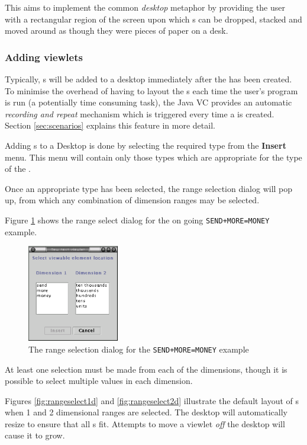 This \viewer{} aims to implement the common \emph{desktop} metaphor by
providing the user with a rectangular region of the screen upon which
\viewlet{}s can be dropped, stacked and moved around as though they
were pieces of paper on a desk.

\subsubsection{Adding viewlets}
Typically, \viewlet{}s will be added to a desktop immediately after the
\viewer{} has been created.  To minimise the overhead of having to
layout the \viewlet{}s each time the user's program is run (a
potentially time consuming task), the Java VC provides an automatic
\emph{recording and repeat} mechanism which is triggered every time a
\viewer{} is created. Section \ref{sec:scenarios} explains this
feature in more detail.

Adding \viewlet{}s to a Desktop \viewer{} is done by selecting the
required \viewlet{} type from the \textbf{Insert} menu.  This menu
will contain only those \viewlet{} types which are appropriate for the
type of the \viewable{}.

Once an appropriate \viewlet{} type has been selected, the range
selection dialog will pop up, from which any combination of dimension
ranges may be selected.

Figure \ref{fig:rangeselect} shows the range select dialog for the on
going \texttt{SEND+MORE=MONEY} example.

\begin{figure}[htp]
\centering
\includegraphics[width=4cm]{vcrangeselect}
\caption{The range selection dialog for the \texttt{SEND+MORE=MONEY} example}
\label{fig:rangeselect}
\end{figure}

At least one selection must be made from each of the dimensions,
though it is possible to select multiple values in each dimension.

Figures \ref{fig:rangeselect1d} and \ref{fig:rangeselect2d} illustrate
the default layout of \viewlet{}s when 1 and 2 dimensional ranges are
selected. The desktop will automatically resize to ensure that all
\viewlet{}s fit.  Attempts to move a viewlet \emph{off} the desktop
will cause it to grow.

